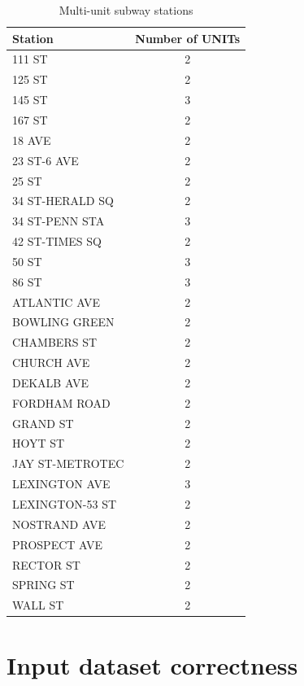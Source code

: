 \documentclass{article}
\begin{document}
\begin{table}[h]
\centering
\begin{tabular}{l|c}
\hline
Station & Number of UNITs\\
\hline
111 ST &            2\\[3pt]
125 ST  &           2\\[3pt]
145 ST   &          3\\[3pt]
167 ST    &         2\\[3pt]
18 AVE     &        2\\[3pt]
23 ST-6 AVE &       2\\[3pt]
25 ST        &      2\\[3pt]
34 ST-HERALD SQ &   2\\[3pt]
34 ST-PENN STA  &   3\\[3pt]
42 ST-TIMES SQ  &   2\\[3pt]
50 ST           &   3\\[3pt]
86 ST           &   3\\[3pt]
ATLANTIC AVE    &   2\\[3pt]
BOWLING GREEN   &   2\\[3pt]
CHAMBERS ST     &   2\\[3pt]
CHURCH AVE      &   2\\[3pt]
DEKALB AVE      &   2\\[3pt]
FORDHAM ROAD    &   2\\[3pt]
GRAND ST        &   2\\[3pt]
HOYT ST         &   2\\[3pt]
JAY ST-METROTEC &   2\\[3pt]
LEXINGTON AVE   &   3\\[3pt]
LEXINGTON-53 ST &   2\\[3pt]
NOSTRAND AVE    &   2\\[3pt]
PROSPECT AVE    &   2\\[3pt]
RECTOR ST       &   2\\[3pt]
SPRING ST       &   2\\[3pt]
WALL ST         &   2\\
\hline
\end{tabular}
\caption{Multi-unit subway stations}
\label{tab:multi-unit-stations}
\end{table}


\section {Input dataset correctness}
\end{document}
